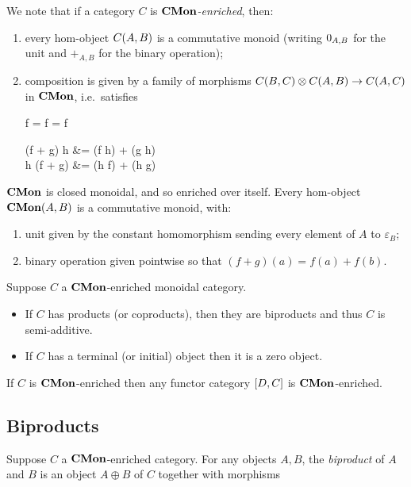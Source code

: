 We note that if a category $C$ is \emph{$\mathbf{CMon}$-enriched}, then:
\begin{enumerate}
\item every hom-object ${C}(A,B)$ is a commutative monoid (writing $0_{A,B}$ for the unit and
$+_{A,B}$ for the binary operation);
\item composition is given by a family of morphisms ${C}(B,C) \otimes {C}(A,B) \to {C}(A,C)$ in
$\mathbf{CMon}$, i.e.~satisfies

\begin{salign*}
f \comp \zero = f = \zero \comp f
\end{salign*}
\begin{salign*}
(f + g) \comp h &= (f \comp h) + (g \comp h) \\
h \comp (f + g) &= (h \comp f) + (h \comp g)
\end{salign*}
\end{enumerate}

$\mathbf{CMon}$ is closed monoidal, and so enriched over itself. Every hom-object $\mathbf{CMon}(A,B)$ is a commutative
monoid, with:
\begin{enumerate}
\item unit given by the constant homomorphism sending every element of $A$ to $\varepsilon_B$;
\item binary operation given pointwise so that $(f + g)(a) = f(a) + f(b)$.
\end{enumerate}

\begin{proposition}
Suppose $C$ a $\mathbf{CMon}$-enriched monoidal category.
\begin{itemize}
\item If $C$ has products (or coproducts), then they are biproducts and thus $C$ is semi-additive.
\item If $C$ has a terminal (or initial) object then it is a zero object.
\end{itemize}
\end{proposition}

If $C$ is $\mathbf{CMon}$-enriched then any functor category $[D,C]$ is $\mathbf{CMon}$-enriched.

\subsection{Biproducts}

Suppose $C$ a $\mathbf{CMon}$-enriched category. For any objects $A, B$, the \emph{biproduct} of $A$ and $B$ is an
object $A \oplus B$ of $C$ together with morphisms


